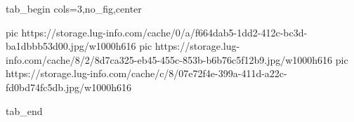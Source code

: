  
 
 
 
 


\ifcmt
  tab_begin cols=3,no_fig,center

     pic https://storage.lug-info.com/cache/0/a/f664dab5-1dd2-412c-bc3d-ba1dbbb53d00.jpg/w1000h616%
		 pic https://storage.lug-info.com/cache/8/2/8d7ca325-eb45-455c-853b-b6b76c5f12b9.jpg/w1000h616%
		 pic https://storage.lug-info.com/cache/c/8/07e72f4e-399a-411d-a22c-fd0bd74fc5db.jpg/w1000h616%

  tab_end
\fi
